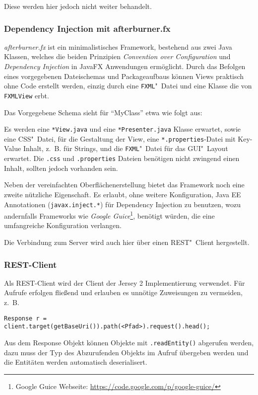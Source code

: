 Diese werden hier jedoch nicht weiter behandelt. 

\subsubsection{Dependency Injection mit afterburner.fx}
\emph{afterburner.fx} \cite{Bien.2014} ist ein minimalistisches Framework, bestehend aus zwei Java Klassen, welches die beiden Prinzipien \emph{Convention over Configuration} und \emph{Dependency Injection} in JavaFX Anwendungen ermöglicht.
Durch das Befolgen eines vorgegebenen Dateischemas und Packageaufbaus können Views praktisch ohne Code erstellt werden, einzig durch eine \texttt{FXML}"~Datei und eine Klasse die von \texttt{FXMLView} erbt.

Das Vorgegebene Schema sieht für \enquote{MyClass} etwa wie folgt aus:


Es werden eine \texttt{*View.java} und eine \texttt{*Presenter.java} Klasse erwartet, sowie eine \ac{CSS}"~Datei, für die Gestaltung der View, eine \texttt{*.properties}-Datei mit Key-Value Inhalt, z.~B. für Strings, und die \texttt{FXML}"~Datei für das \ac{GUI}"~Layout erwartet.
Die \texttt{.css} und \texttt{.properties} Dateien benötigen nicht zwingend einen Inhalt, sollten jedoch vorhanden sein.

Neben der vereinfachten Oberflächenerstellung bietet das Framework noch eine zweite nützliche Eigenschaft.
Es erlaubt, ohne weitere Konfiguration, Java EE Annotationen (\texttt{javax.inject.*}) für Dependency Injection zu benutzen, wozu andernfalls Frameworks wie \emph{Google Guice}\footnote{Google Guice Webseite: \url{https://code.google.com/p/google-guice/}}, benötigt würden, die eine umfangreiche Konfiguration verlangen. \cite[Vgl.][]{Bien.2014}

Die Verbindung zum Server wird auch hier über einen \ac{REST}"~Client hergestellt.

\subsubsection{REST-Client}
Als \ac{REST}-Client wird der Client der Jersey 2 Implementierung verwendet.
Für Aufrufe erfolgen fließend und erlauben es unnötige Zuweisungen zu vermeiden, z.~B.
\begin{center}
\texttt{Response r = client.target(getBaseUri()).path(<Pfad>).request().head();}
\end{center}

Aus dem Response Objekt können Objekte mit \texttt{.readEntity()} abgerufen werden, dazu muss der Typ des Abzurufenden Objekts im Aufruf übergeben werden und die Entitäten werden automatisch deserialisert. \cite[Vgl.][113\psqq]{Burke.2014}



